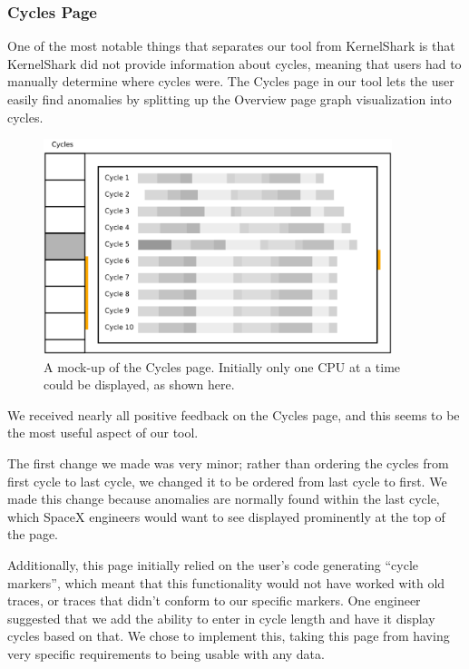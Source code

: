 \documentclass{hmcclinic}
\begin{document}
\subsubsection{Cycles Page}

One of the most notable things that separates our tool from KernelShark is that
KernelShark did not provide information about cycles, meaning that users had to
manually determine where cycles were.
The Cycles page in our tool lets the user easily find anomalies by splitting up
the Overview page graph visualization into cycles.

\begin{figure}[H]
\begin{center}
\includegraphics[width=4in]{oldcycles.png}
\caption{A mock-up of the Cycles page. Initially only one CPU at a time could be
displayed, as shown here.}
\end{center}
\end{figure}

We received nearly all positive feedback on the Cycles page, and this seems to
be the most useful aspect of our tool.

The first change  we made was very minor; rather than ordering the cycles from first cycle to last cycle, we changed it to be ordered from last cycle to first. We made this change because anomalies are normally found within the last cycle, which SpaceX engineers would want to see displayed prominently at the top of the page.

Additionally, this page initially relied on the user's code generating ``cycle
markers'', which meant that this functionality would not have worked with old
traces, or traces that didn't conform to our specific markers. One engineer
suggested that we add the ability to enter in cycle length and have it display
cycles based on that. We chose to implement this, taking this page from having
very specific requirements to being usable with any data.
\end{document}
